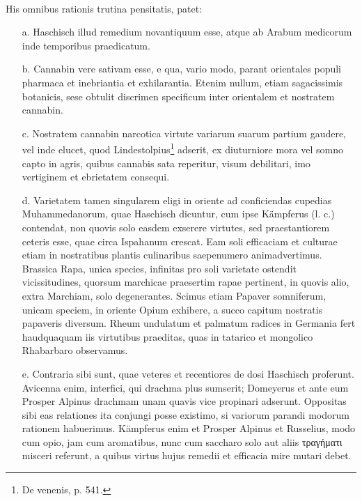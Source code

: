 \documentclass[a4paper, 11pt, oneside, polutonikogreek, english]{article}
\begin{document}
\paragraph{}
His omnibus rationis trutina pensitatis, patet:
\begin{itemize}
    \item[a.] Haschisch illud remedium novantiquum esse, atque ab Arabum medicorum inde temporibus praedicatum.

    \item[b.] Cannabin vere sativam esse, e qua, vario modo, parant orientales populi pharmaca et inebriantia et exhilarantia. Etenim nullum, etiam sagacissimis botanicis, sese obtulit discrimen specificum inter orientalem et nostratem cannabin.

    \item[c.] Nostratem cannabin narcotica virtute variarum suarum partium gaudere, vel inde elucet, quod Lindestolpius\footnote{De venenis, p. 541.} adserit, ex diuturniore mora vel somno capto in agris, quibus cannabis sata reperitur, visum debilitari, imo vertiginem et ebrietatem consequi.

    \item[d.] Varietatem tamen singularem eligi in oriente ad conficiendas cupedias Muhammedanorum, quae Haschisch dicuntur, cum ipse Kämpferus (l. c.) contendat, non quovis solo easdem exserere virtutes, sed praestantiorem ceteris esse, quae circa Ispahanum crescat. Eam soli efficaciam et culturae etiam in nostratibus plantis culinaribus saepenumero animadvertimus. Brassica Rapa, unica species, infinitas pro soli varietate ostendit vicissitudines, quorsum marchicae praesertim rapae pertinent, in quovis alio, extra Marchiam, solo degenerantes. Scimus etiam Papaver somniferum, unicam speciem, in oriente Opium exhibere, a succo capitum nostratis papaveris diversum. Rheum undulatum et palmatum radices in Germania fert haudquaquam iis virtutibus praeditas, quas in tatarico et mongolico Rhabarbaro observamus.

    \item[e.] Contraria sibi sunt, quae veteres et recentiores de dosi Haschisch proferunt. Avicenna enim, interfici, qui drachma plus sumserit; Domeyerus et ante eum Prosper Alpinus drachmam unam quavis vice propinari adserunt. Oppositas sibi eas relationes ita conjungi posse existimo, si variorum parandi modorum rationem habuerimus. Kämpferus enim et Prosper Alpinus et Russelius, modo cum opio, jam cum aromatibus, nunc cum saccharo solo aut aliis τραγήματι misceri referunt, a quibus virtus hujus remedii et efficacia mire mutari debet.
\end{itemize}
\end{document}
